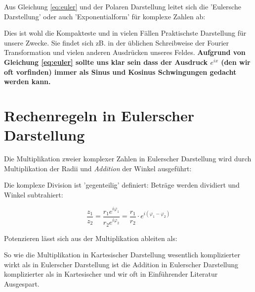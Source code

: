 
Aus Gleichung \ref{eq:euler} und der Polaren Darstellung leitet sich die 'Eulersche Darstellung' oder auch 'Exponentialform' für komplexe Zahlen ab:


Dies ist wohl die Kompakteste und in vielen Fällen Praktischste Darstellung für unsere Zwecke. Sie findet sich zB. in der üblichen Schreibweise der Fourier Transformation und vielen anderen Ausdrücken unseres Feldes. \textbf{Aufgrund von Gleichung \ref{eq:euler} sollte uns klar sein dass der Ausdruck $e^{ix}$ (den wir oft vorfinden) immer als Sinus und Kosinus Schwingungen gedacht werden kann.}

\section{Rechenregeln in Eulerscher Darstellung}

Die Multiplikation zweier komplexer Zahlen in Eulerscher Darstellung wird durch Multiplikation der Radii und \emph{Addition} der Winkel ausgeführt:


Die komplexe Division ist 'gegenteilig' definiert: Beträge werden dividiert und Winkel subtrahiert:

$$\frac{z_1}{z_2} = \frac{r_1e^{i\varphi_1}} { r_2e^{i\varphi_2}} =  \frac{r_1}{ r_2} \cdot e^{i (\varphi_1 - \varphi_2)}$$


Potenzieren lässt sich aus der Multiplikation ableiten als: 


So wie die Multiplikation in Kartesischer Darstellung wesentlich komplizierter wirkt als in Eulerscher Darstellung ist die Addition in Eulerscher Darstellung komplizierter als in Kartesischer und wir oft in Einführender Literatur Ausgespart.


